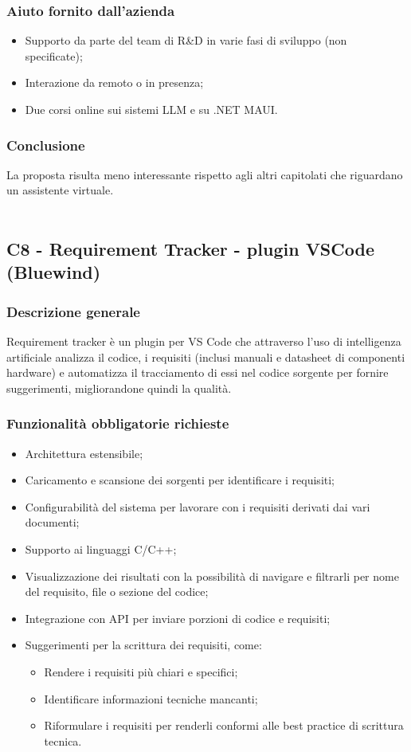 \documentclass[10pt]{article}
\begin{document}
\subsubsection{Aiuto fornito dall'azienda}
\begin{itemize}
\item Supporto da parte del team di R\&D in varie fasi di sviluppo (non specificate);
\item Interazione da remoto o in presenza;
\item Due corsi online sui sistemi LLM e su .NET MAUI.

\end{itemize}
\subsubsection{Conclusione}
La proposta risulta meno interessante rispetto agli altri capitolati che riguardano un assistente virtuale.
\\\\

\subsection{C8 - Requirement Tracker - plugin VSCode (Bluewind)}
\subsubsection{Descrizione generale}
Requirement tracker è un plugin per VS Code che attraverso l’uso di intelligenza artificiale analizza il codice, i requisiti (inclusi manuali e datasheet di componenti hardware) e automatizza il tracciamento di essi nel codice sorgente per fornire suggerimenti, migliorandone quindi la qualità.
\subsubsection{Funzionalità obbligatorie richieste}
\begin{itemize}
    \item Architettura estensibile;
    \item Caricamento e scansione dei sorgenti per identificare i requisiti;
    \item Configurabilità del sistema per lavorare con i requisiti derivati dai vari documenti;
    \item Supporto ai linguaggi C/C++;
    \item Visualizzazione dei risultati con la possibilità di navigare e filtrarli per nome del requisito, file o sezione del codice;
    \item Integrazione con API per inviare porzioni di codice e requisiti;
    \item Suggerimenti per la scrittura dei requisiti, come:
    \begin{itemize}
    \item Rendere i requisiti più chiari e specifici;
    \item Identificare informazioni tecniche mancanti;
    \item Riformulare i requisiti per renderli conformi alle best practice di scrittura tecnica.
\end{itemize}
\end{itemize}
\end{document}
